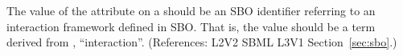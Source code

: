 The value of the  attribute on a \Model should be
an SBO identifier referring to an interaction framework defined
in SBO.  That is, the value should be a term derived from
\sbointeractionID, ``interaction''.  (References: L2V2
SBML L3V1 Section~\ref{sec:sbo}.)
